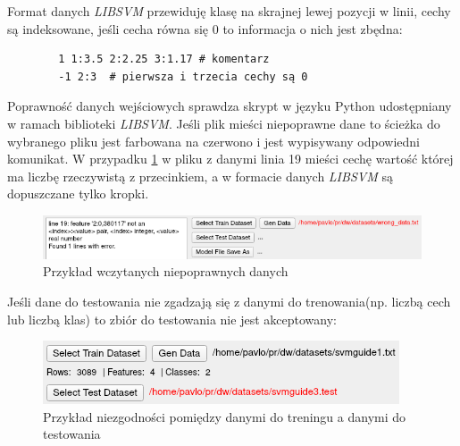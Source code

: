 \documentclass[paper=a4, fontsize=11pt]{scrartcl} %
\numberwithin{equation}{section} %
\numberwithin{figure}{section} %
\begin{document}
    Format danych \textit{LIBSVM} przewiduję klasę na skrajnej lewej pozycji w linii, cechy są
    indeksowane, jeśli cecha równa się 0 to informacja o nich jest zbędna:

    \begin{verbatim}
        1 1:3.5 2:2.25 3:1.17 # komentarz
        -1 2:3  # pierwsza i trzecia cechy są 0
    \end{verbatim}

    \par Poprawność danych wejściowych sprawdza skrypt w języku Python udostępniany w ramach
    biblioteki \textit{LIBSVM}. Jeśli plik mieści niepoprawne dane to ścieżka do wybranego
    pliku jest farbowana na czerwono i jest wypisywany odpowiedni komunikat. W przypadku
    \ref{fig:files_example1} w pliku z danymi linia 19 mieści cechę wartość której ma liczbę
    rzeczywistą z przecinkiem, a w formacie danych \textit{LIBSVM} są dopuszczane tylko kropki.

    \begin{figure}[h]
        \begin{center}
            \includegraphics[scale=0.8]{./img/svm_app_mainw_filehandler_ex_wrong.png}
            \caption{Przykład wczytanych niepoprawnych danych}
            \label{fig:files_example1}
        \end{center}
    \end{figure}

    \par Jeśli dane do testowania nie zgadzają się z danymi do trenowania(np. liczbą cech lub
    liczbą klas) to zbiór do testowania nie jest akceptowany: 

    \begin{figure}[h]
        \begin{center}
            \includegraphics[scale=1.0]{./img/svm_app_mainw_filehandler_ex_wrong2.png}
            \caption{Przykład niezgodności pomiędzy danymi do treningu a danymi do testowania}
            \label{fig:files_example2}
        \end{center}
    \end{figure}
\end{document}
